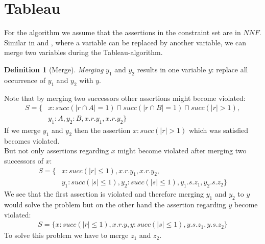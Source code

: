 \documentclass[a4paper,11pt]{scrartcl}
\theoremstyle{break}
\theoremstyle{definition}
\newtheorem{mydef}{Definition}
\begin{document}
\section{Tableau}
For the algorithm we assume that the assertions in the constraint set are in $NNF$. Similar in \cite{1} and \cite{6}, where a variable can be replaced by another variable, we can merge two variables during the Tableau-algorithm.
\begin{mydef}[Merge]
\textit{Merging} $y_1$ and $y_2$ results in one variable $y$: replace all occurrence of $y_1$ and $y_2$ with $y$. 
\end{mydef}
Note that by merging two successors other assertions might become violated:
\begin{align}
S=\{&x:succ(|r\cap A|=1)\sqcap succ(|r\cap B|=1)\sqcap succ(|r|>1),\nonumber\\ &y_1:A, y_2:B, x.r.y_1, x.r.y_2\}
\end{align}
If we merge $y_1$ and $y_2$ then the assertion $x:succ(|r|>1)$ which was satisfied becomes violated.\\
But not only assertions regarding $x$ might become violated after merging two successors of $x$: 
\begin{align}
S=\{&x:succ(|r|\leq 1), x.r.y_1, x.r.y_2,\nonumber
\\&y_1:succ(|s|\leq 1), y_2:succ(|s|\leq 1), y_1.s.z_1, y_2.s.z_2\}
\end{align}
We see that the first assertion is violated and therefore merging $y_1$ and $y_2$ to $y$ would solve the problem but on the other hand the assertion regarding $y$ become violated: 
\begin{align*}
S=\{x:succ(|r|\leq 1), x.r.y,
y:succ(|s|\leq 1), y.s.z_1, y.s.z_2\}
\end{align*}
To solve this problem we have to merge $z_1$ and $z_2$.
\end{document}
